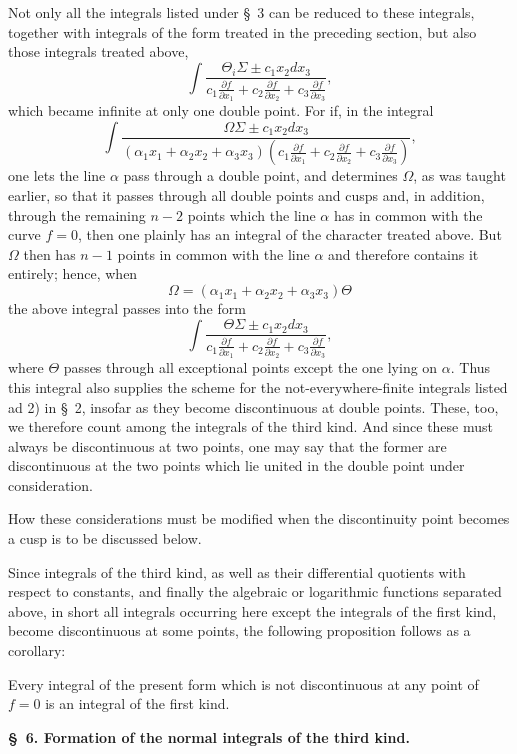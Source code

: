 \documentclass[10pt]{article}
\begin{document}
Not only all the integrals listed under \S\ 3 can be reduced to these integrals, together with integrals of the form treated in the preceding section, but also those integrals treated above,
\[
\int\frac{\Theta_i\Sigma\pm c_1x_2dx_3}{c_1\frac{\partial f}{\partial x_1}+c_2\frac{\partial f}{\partial x_2}+c_3\frac{\partial f}{\partial x_3}},
\]
which became infinite at only one double point. For if, in the integral
\[
\int\frac{\Omega\Sigma\pm c_1x_2dx_3}{(\alpha_1x_1+\alpha_2x_2+\alpha_3x_3)\left(c_1\frac{\partial f}{\partial x_1}+c_2\frac{\partial f}{\partial x_2}+c_3\frac{\partial f}{\partial x_3}\right)},
\]
one lets the line $\alpha$ pass through a double point, and determines $\Omega$, as was taught earlier, so that it passes through all double points and cusps and, in addition, through the remaining $n-2$ points which the line $\alpha$ has in common with the curve $f=0$, then one plainly has an integral of the character treated above. But $\Omega$ then has $n-1$ points in common with the line $\alpha$ and therefore contains it entirely; hence, when
\[
\Omega=(\alpha_1x_1+\alpha_2x_2+\alpha_3x_3)\Theta
\]
the above integral passes into the form
\[
\int\frac{\Theta\Sigma\pm c_1x_2dx_3}{c_1\frac{\partial f}{\partial x_1}+c_2\frac{\partial f}{\partial x_2}+c_3\frac{\partial f}{\partial x_3}},
\]
where $\Theta$ passes through all exceptional points except the one lying on $\alpha$. Thus this integral also supplies the scheme for the not-everywhere-finite integrals listed ad 2) in \S\ 2, insofar as they become discontinuous at double points. These, too, we therefore count among the integrals of the third kind. And since these must always be discontinuous at two points, one may say that the former are discontinuous at the two points which lie united in the double point under consideration.

How these considerations must be modified when the discontinuity point becomes a cusp is to be discussed below.

Since integrals of the third kind, as well as their differential quotients with respect to constants, and finally the algebraic or logarithmic functions separated above, in short all integrals occurring here except the integrals of the first kind, become discontinuous at some points, the following proposition follows as a corollary:

Every integral of the present form which is not discontinuous at any point of $f=0$ is an integral of the first kind.

\begin{center}
{\bfseries \S\ 6. Formation of the normal integrals of the third kind.}
\end{center}
\end{document}
